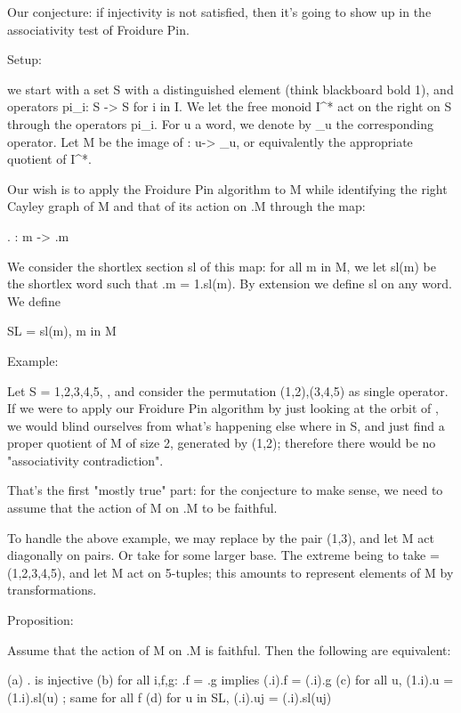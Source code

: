 \documentclass[12pt]{amsart}
\begin{document}
\begin{abstract}
\end{abstract}

Our conjecture: if injectivity is not satisfied, then it's going to
show up in the associativity test of Froidure Pin.


Setup:

    we start with a set S with a distinguished element \1 (think
    blackboard bold 1), and operators pi_i: S -> S for i in I. We let
    the free monoid I^* act on the right on S through the operators
    pi_i. For u a word, we denote by \pi_u the corresponding operator.
    Let M be the image of \pi: u-> \pi_u, or equivalently the
    appropriate quotient of I^*.

    Our wish is to apply the Froidure Pin algorithm to M while
    identifying the right Cayley graph of M and that of its action on
    \1.M through the map:

        \1.  :   m  ->  \1.m

    We consider the shortlex section sl of this map: for all m in M,
    we let sl(m) be the shortlex word such that \1.m = 1.sl(m). By
    extension we define sl on any word. We define

        SL = { sl(m),  m in M }

Example:

    Let S = {1,2,3,4,5}, , and consider the permutation
    (1,2),(3,4,5) as single operator. If we were to apply our Froidure
    Pin algorithm by just looking at the orbit of \1, we would blind
    ourselves from what's happening else where in S, and just find a
    proper quotient of M of size 2, generated by (1,2); therefore
    there would be no "associativity contradiction".

That's the first "mostly true" part: for the conjecture to make sense,
we need to assume that the action of M on \1.M to be faithful.

To handle the above example, we may replace \1 by the pair (1,3), and
let M act diagonally on pairs. Or take for \1 some larger base. The
extreme being to take \1 = (1,2,3,4,5), and let M act on 5-tuples;
this amounts to represent elements of M by transformations.

Proposition:

    Assume that the action of M on \1.M is faithful.
    Then the following are equivalent:

    (a)  \1. is injective
    (b)  for all i,f,g:       \1.f = \1.g implies (\1.i).f = (\1.i).g
    (c)  for all u,           (1.i).u = (1.i).sl(u) ;  same for all f
    (d)  for u in SL,         (\1.i).uj = (\1.i).sl(uj)
\end{document}
